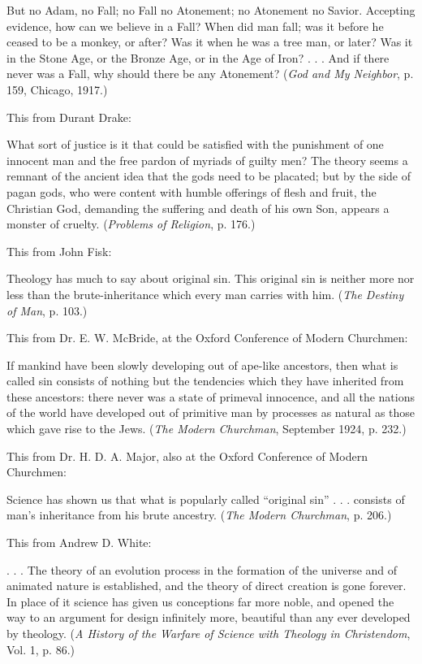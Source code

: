 But no Adam, no Fall; no Fall no Atonement; no Atonement no Savior. Accepting evidence,
how can we believe in a Fall? When did man fall; was it before he ceased to be a monkey, or
after? Was it when he was a tree man, or later? Was it in the Stone Age, or the Bronze Age,
or in the Age of Iron? . . . And if there never was a Fall, why should there be any Atonement?
(\textit{God and My Neighbor}, p. 159, Chicago, 1917.)

This from Durant Drake:

What sort of justice is it that could be satisfied with the punishment of one innocent man and
the free pardon of myriads of guilty men? The theory seems a remnant of the ancient idea
that the gods need to be placated; but by the side of pagan gods, who were content with
humble offerings of flesh and fruit, the Christian God, demanding the suffering and death of
his own Son, appears a monster of cruelty. (\textit{Problems of Religion}, p. 176.)

This from John Fisk:

Theology has much to say about original sin. This original sin is neither more nor less than
the brute-inheritance which every man carries with him. (\textit{The Destiny of Man}, p. 103.)

This from Dr. E. W. McBride, at the Oxford Conference of Modern Churchmen:

If mankind have been slowly developing out of ape-like ancestors, then what is called sin
consists of nothing but the tendencies which they have inherited from these ancestors: there
never was a state of primeval innocence, and all the nations of the world have developed out
of primitive man by processes as natural as those which gave rise to the Jews. (\textit{The Modern
Churchman}, September 1924, p. 232.)

This from Dr. H. D. A. Major, also at the Oxford Conference of Modern Churchmen:

Science has shown us that what is popularly called ``original sin'' . . . consists of man's
inheritance from his brute ancestry. (\textit{The Modern Churchman}, p. 206.)

This from Andrew D. White:

. . . The theory of an evolution process in the formation of the universe and of animated
nature is established, and the theory of direct creation is gone forever. In place of it science
has given us conceptions far more noble, and opened the way to an argument for design
infinitely more, beautiful than any ever developed by theology. (\textit{A History of the Warfare of
Science with Theology in Christendom}, Vol. 1, p. 86.)

